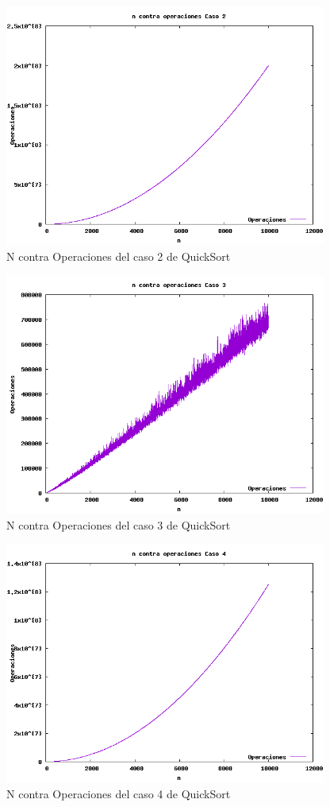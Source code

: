 \documentclass[spanish]{article}
\begin{document}
	\begin{figure}[H]
		\centering
		\includegraphics[width=400px,height=300px]{grafica4}
		\caption{N contra Operaciones del caso 2 de QuickSort}
	\end{figure}	
	\begin{figure}[H]
		\centering
		\includegraphics[width=400px,height=300px]{grafica5}
		\caption{N contra Operaciones del caso 3 de QuickSort}
	\end{figure}	
	\begin{figure}[H]
		\centering
		\includegraphics[width=400px,height=300px]{grafica6}
		\caption{N contra Operaciones del caso 4 de QuickSort}
	\end{figure}	
\end{document}
